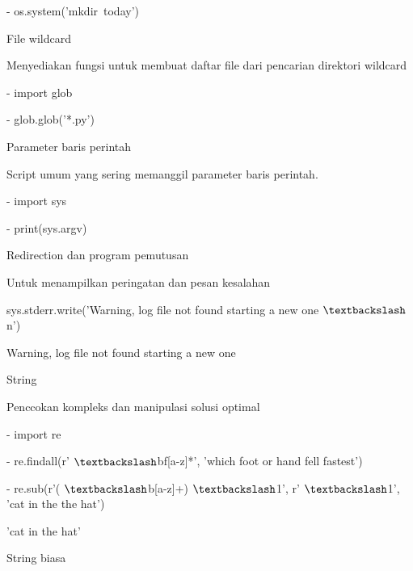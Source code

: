 \vspace{12pt}
\noindent 
- os.system('mkdir~today')~   \par
{} \par
\vspace{12pt}
\noindent 
File wildcard \par
\noindent 
Menyediakan fungsi untuk membuat daftar file dari pencarian direktori wildcard \par
\vspace{12pt}
\noindent 
- import glob \par
\vspace{12pt}
\noindent 
- glob.glob('*.py') \par
{} \par
\noindent 
Parameter baris perintah  \par
\noindent 
Script umum yang sering memanggil parameter baris perintah.  \par
\noindent 
- import sys \par
\noindent 
- print(sys.argv) \par
{} \par
\vspace{12pt}
\noindent 
Redirection dan program pemutusan \par
\noindent 
Untuk menampilkan peringatan dan pesan kesalahan \par
\noindent 
 sys.stderr.write('Warning, log file not found starting a new one $  \textbackslash  $n') \par
\noindent 
Warning, log file not found starting a new one \par
\noindent 
String \par
\noindent 
Penccokan kompleks dan manipulasi solusi optimal \par
\noindent 
- import re \par
\noindent 
- re.findall(r' $  \textbackslash  $bf[a-z]*', 'which foot or hand fell fastest') \par
{} \par
\vspace{12pt}
\noindent 
- re.sub(r'( $  \textbackslash  $b[a-z]+)  $  \textbackslash  $1', r' $  \textbackslash  $1', 'cat in the the hat') \par
\noindent 
'cat in the hat' \par
\vspace{12pt}
\noindent 
String biasa \par
